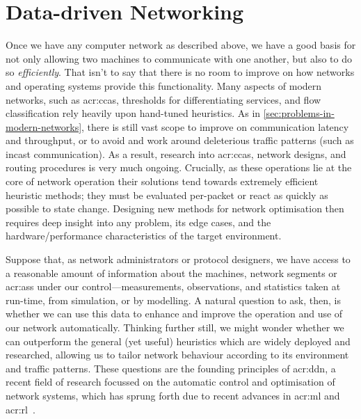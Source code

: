 \chapter{Data-driven Networking}\label{chap:ddn}
Once we have any computer network as described above, we have a good basis for not only allowing two machines to communicate with one another, but also to do so \emph{efficiently}.
That isn't to say that there is no room to improve on how networks and operating systems provide this functionality.
Many aspects of modern networks, such as \glspl{acr:cca}, thresholds for differentiating services, and flow classification rely heavily upon hand-tuned heuristics.
As in \cref{sec:problems-in-modern-networks}, there is still vast scope to improve on communication latency and throughput, or to avoid and work around deleterious traffic patterns (such as incast communication).
As a result, research into \glspl{acr:cca}, network designs, and routing procedures is very much ongoing.
Crucially, as these operations lie at the core of network operation their solutions tend towards extremely efficient heuristic methods; they must be evaluated per-packet or react as quickly as possible to state change.
Designing new methods for network optimisation then requires deep insight into any problem, its edge cases, and the hardware/performance characteristics of the target environment.

Suppose that, as network administrators or protocol designers, we have access to a reasonable amount of information about the machines, network segments or \glspl{acr:as} under our control---measurements, observations, and statistics taken at run-time, from simulation, or by modelling.
A natural question to ask, then, is whether we can use this data to enhance and improve the operation and use of our network automatically.
Thinking further still, we might wonder whether we can outperform the general (yet useful) heuristics which are widely deployed and researched, allowing us to tailor network behaviour according to its environment and traffic patterns.
These questions are the founding principles of \gls{acr:ddn}, a recent field of research focussed on the automatic control and optimisation of network systems, which has sprung forth due to recent advances in \gls{acr:ml} and \gls{acr:rl}~\parencite{DBLP:conf/anrw/FeamsterR18,DBLP:journals/pieee/KellererKBBR019}.


